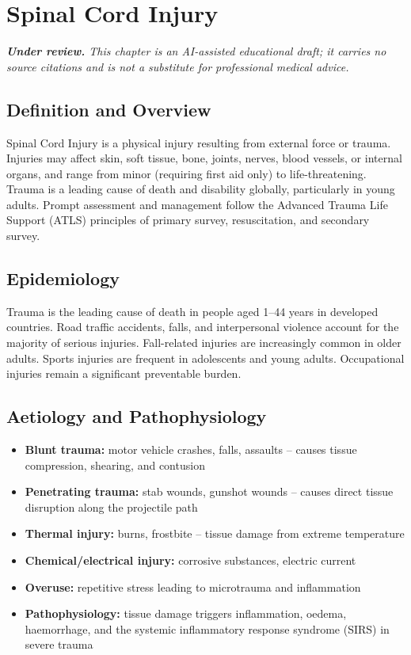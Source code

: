 \chapter{Spinal Cord Injury}

\medskip
\noindent\textit{\textbf{Under review.} This chapter is an AI-assisted educational draft; it carries no source citations and is not a substitute for professional medical advice.}

\section*{Definition and Overview}
Spinal Cord Injury is a physical injury resulting from external force or trauma. Injuries may affect skin, soft tissue, bone, joints, nerves, blood vessels, or internal organs, and range from minor (requiring first aid only) to life-threatening. Trauma is a leading cause of death and disability globally, particularly in young adults. Prompt assessment and management follow the Advanced Trauma Life Support (ATLS) principles of primary survey, resuscitation, and secondary survey.

\section*{Epidemiology}
Trauma is the leading cause of death in people aged 1--44 years in developed countries. Road traffic accidents, falls, and interpersonal violence account for the majority of serious injuries. Fall-related injuries are increasingly common in older adults. Sports injuries are frequent in adolescents and young adults. Occupational injuries remain a significant preventable burden.

\section*{Aetiology and Pathophysiology}
\begin{itemize}
    \item \textbf{Blunt trauma:} motor vehicle crashes, falls, assaults -- causes tissue compression, shearing, and contusion
    \item \textbf{Penetrating trauma:} stab wounds, gunshot wounds -- causes direct tissue disruption along the projectile path
    \item \textbf{Thermal injury:} burns, frostbite -- tissue damage from extreme temperature
    \item \textbf{Chemical/electrical injury:} corrosive substances, electric current
    \item \textbf{Overuse:} repetitive stress leading to microtrauma and inflammation
    \item \textbf{Pathophysiology:} tissue damage triggers inflammation, oedema, haemorrhage, and the systemic inflammatory response syndrome (SIRS) in severe trauma
\end{itemize}

